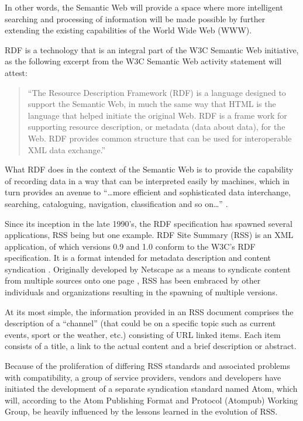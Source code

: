 \documentclass{CRPITStyle}
\begin{document}
In other words, the Semantic Web will provide a space where more
intelligent searching and processing of information will be made
possible by further extending the existing capabilities of the World
Wide Web (WWW).

RDF is a technology that is an integral part of the W3C Semantic Web
initiative, as the following excerpt from the W3C Semantic Web activity
statement will attest:

\begin{quotation}
	``The Resource Description Framework (RDF) is a language designed to
	support the Semantic Web, in much the same way that HTML is the
	language that helped initiate the original Web. RDF is a frame work
	for supporting resource description, or metadata (data about data),
	for the Web. RDF provides common structure that can be used for
	interoperable XML data exchange.'' \cite{Powe-S-2003-RDF}
\end{quotation}

What RDF does in the context of the Semantic Web is to provide the
capability of recording data in a way that can be interpreted easily by
machines, which in turn provides an avenue to ``\ldots{}more efficient and
sophisticated data interchange, searching, cataloguing, navigation,
classification and so on\ldots{}'' \cite{Powe-S-2003-RDF}.

Since its inception in the late 1990's, the RDF specification has
spawned several applications, RSS being but one example. RDF Site
Summary (RSS) is an XML application, of which versions 0.9 and 1.0
conform to the W3C's RDF specification. It is a format intended for
metadata description and content syndication \cite{Mano-F-2004-RDF}.
Originally developed by Netscape as a means to syndicate content from
multiple sources onto one page \cite{Nott-M-2005-Atom}, RSS has been
embraced by other individuals and organizations resulting in the
spawning of multiple versions.

At its most simple, the information provided in an RSS document
comprises the description of a ``channel'' (that could be on a specific
topic such as current events, sport or the weather, etc.) consisting of
URL linked items. Each item consists of a title, a link to the actual
content and a brief description or abstract.

Because of the proliferation of differing RSS standards and associated
problems with compatibility, a group of service providers, vendors and
developers have initiated the development of a separate syndication
standard named Atom, which will, according to the Atom Publishing Format
and Protocol (Atompub) Working Group, be heavily influenced by the
lessons learned in the evolution of RSS.
\end{document}
